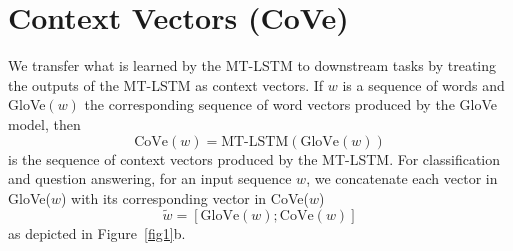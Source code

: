 \section{Context Vectors (CoVe)}

We transfer what is learned by the MT-LSTM to downstream tasks by treating the outputs of the MT-LSTM as context vectors. 
If $w$ is a sequence of words and GloVe$(w)$ the corresponding sequence of word vectors produced by the GloVe model,
then
\begin{equation}
\text{CoVe}(w) = \text{MT-LSTM}(\text{GloVe}(w))
\label{eq:contextVectors}
\end{equation}
is the sequence of context vectors produced by the MT-LSTM. 
For classification and question answering, 
for an input sequence $w$, 
we concatenate each vector in GloVe($w$) with its corresponding vector in CoVe($w$)
\begin{equation}
\tilde w = [\text{GloVe}(w); \text{CoVe}(w)]
\label{eq:concatVectors}
\end{equation}
as depicted in Figure~\ref{fig1}b.